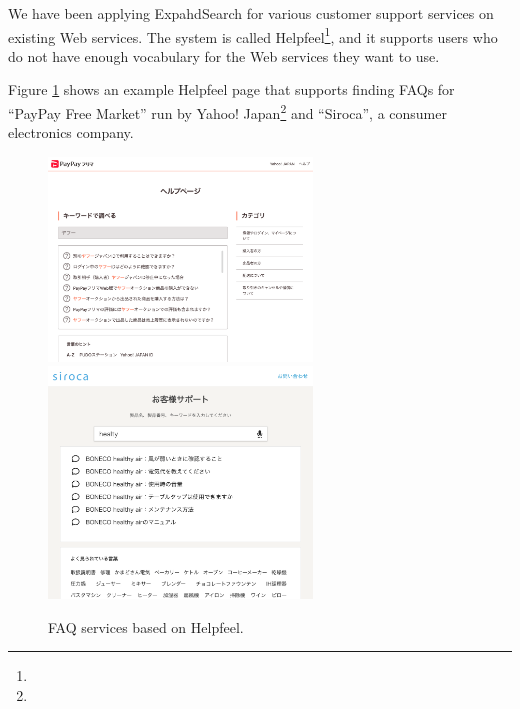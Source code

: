 \documentclass[manuscript,anonymous,review]{acmart}
\def\HF{\textsf{Helpfeel}}
\begin{document}
We have been applying ExpahdSearch for various customer support services on existing Web services.
The system is called {\HF}\footnote{
}, and
it supports users who do not have enough vocabulary for the Web services they want to use.


Figure \ref{paypayhf} shows an example {\HF} page that supports finding FAQs
for ``PayPay Free Market'' run by Yahoo! Japan\footnote{
} and ``Siroca'', a consumer electronics company.


\begin{figure}[H]
  \centering
  \includegraphics[width=7cm,bb=-200 0 1400 1400]{figures/a0ba0873eeada33fad1bc383598f90c1.png}
  \includegraphics[width=7cm,bb=-200 0 1200 1300]{figures/6b491f2701af7193030e332686733568.png}
  \caption{FAQ services based on Helpfeel.} 
  \label{paypayhf}
\end{figure}
\end{document}
